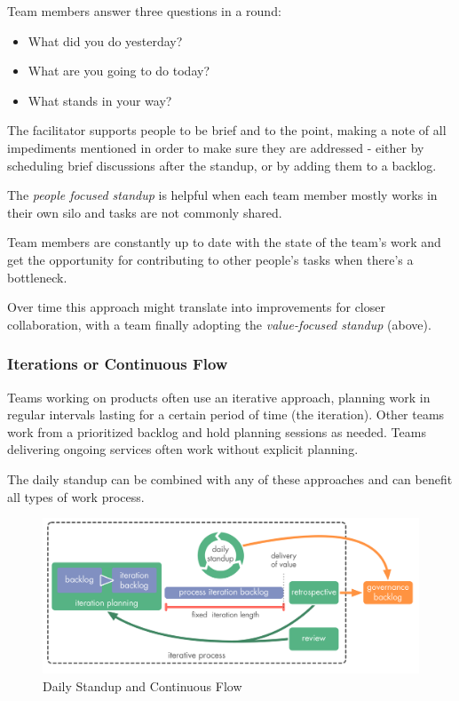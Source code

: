Team members answer three questions in a round:

\begin{itemize}
\item What did you do yesterday?

\item What are you going to do today?

\item What stands in your way?

\end{itemize}

The facilitator supports people to be brief and to the point, making a note of all impediments mentioned in order to make sure they are addressed - either by scheduling brief discussions after the standup, or by adding them to a backlog.

The \emph{people focused standup} is helpful when each team member mostly works in their own silo and tasks are not commonly shared.

Team members are constantly up to date with the state of the team's work and get the opportunity for contributing to other people's tasks when there's a bottleneck.

Over time this approach might translate into improvements for closer collaboration, with a team finally adopting the \emph{value-focused standup} (above).

\subsubsection{Iterations or Continuous Flow}
\label{iterationsorcontinuousflow}

Teams working on products often use an iterative approach, planning work in regular intervals lasting for a certain period of time (the iteration). Other teams work from a prioritized backlog and hold planning sessions as needed. Teams delivering ongoing services often work without explicit planning.

The daily standup can be combined with any of these approaches and can benefit all types of work process.

\begin{figure}[htbp]
\centering
\includegraphics[keepaspectratio,width=\textwidth,height=0.75\textheight]{img/meetings/iterations.png}
\caption{Daily Standup and Continuous Flow}
\end{figure}

